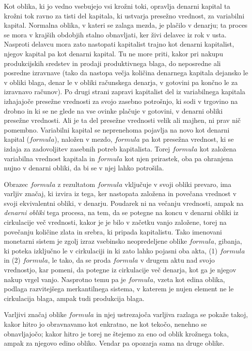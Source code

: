 \documentclass[a5paper]{scrbook}
\begin{document}
Kot oblika, ki jo vedno vsebujejo vsi krožni toki, opravlja denarni kapital ta krožni tok ravno za tisti del kapitala, ki ustvarja presežno vrednost, za variabilni kapital. Normalna oblika, v kateri se zalaga mezda, je plačilo v denarju; ta proces se mora v krajših obdobjih stalno obnavljati, ker živi delavec iz rok v usta. Nasproti delavcu mora zato nastopati kapitalist trajno kot denarni kapitalist, njegov kapital pa kot denarni kapital. Tu ne more priti, kakor pri nakupu produkcijskih sredstev in prodaji produktivnega blaga, do neposredne ali posredne izravnave (tako da nastopa večja količina denarnega kapitala dejansko le v obliki blaga, denar le v obliki računskega denarja, v gotovini pa končno le za izravnavo računov). Po drugi strani zapravi kapitalist del iz variabilnega kapitala izhajajoče presežne vrednosti za svojo zasebno potrošnjo, ki sodi v trgovino na drobno in ki se ne glede na vse ovinke plačuje v gotovini, v denarni obliki presežne vrednosti. Ali je ta del presežne vrednosti velik ali majhen, ni prav nič pomembno. Variabilni kapital se neprenehoma pojavlja na novo kot denarni kapital (\( formula \)), naložen v mezdo, \( formula \) pa kot presežna vrednost, ki se izdaja za zadovoljitev zasebnih potreb kapitalista. Torej \( formula \) kot založena variabilna vrednost kapitala in \( formula \) kot njen prirastek, oba pa ohranjena nujno v denarni obliki, da bi se v njej lahko potrošila.

Obrazec \( formula \) z rezultatom \( formula \) vključuje v svoji obliki prevaro, ima varljiv značaj, ki izvira iz tega, ker nastopata založena in povečana vrednost v svoji ekvivalentni obliki, v denarju. Poudarek ni na večanju vrednosti, ampak na \emph{denarni obliki} tega procesa, na tem, da se potegne na koncu v denarni obliki iz cirkulacije več vrednosti, kakor je je bilo v začetku vanjo založene, torej na povečanju količine zlata in srebra, ki pripada kapitalistu. Tako imenovani monetarni sistem je zgolj izraz vsebinsko neopredeljene oblike \( formula \), gibanja, ki poteka izključno le v cirkulaciji in ki zato lahko pojasni oba akta, (1) \( formula \) in (2) \( formula \), le tako, da se proda \( formula \) v drugem aktu nad svojo vrednostjo, kar pomeni, da potegne iz cirkulacije več denarja, kot ga je njegov nakup vrgel vanjo. Nasprotno temu pa je \( formula \), vzeta kot edina oblika, podlaga razvitejšega merkantilnega sistema, v katerem je nujen element ne le cirkulacija blaga, ampak tudi produkcija blaga.

Varljivi značaj oblike \( formula \) in njej ustrezajoča varljiva razlaga se pokaže takoj, kakor hitro jo obravnavamo kot enkratno, ne kot tekočo, nenehno se obnavljajočo; kakor hitro je torej ne štejemo za eno od oblik krožnega toka, ampak za njegovo edino obliko. Vendar pa opozarja sama na druge oblike.
\end{document}
